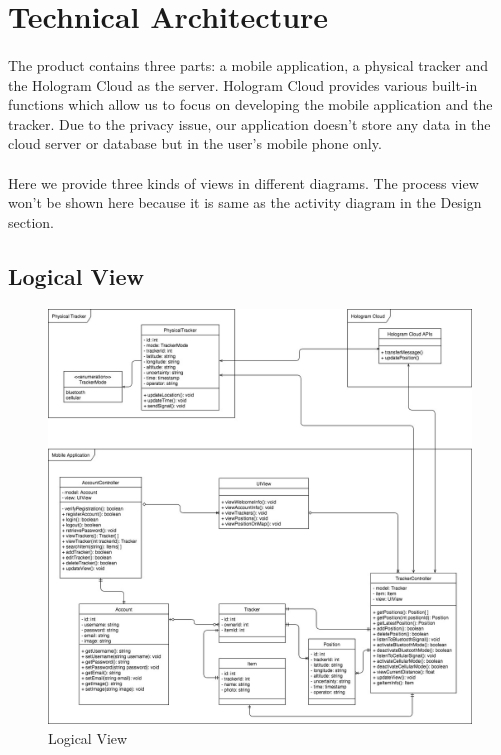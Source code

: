 \documentclass[12pt,a4paper]{article}
\begin{document}
    \section{Technical Architecture}          
      \paragraph{}
        The product contains three parts: a mobile application, a physical tracker and the Hologram Cloud as the server. Hologram Cloud provides various built-in functions which allow us to focus on developing the mobile application and the tracker. Due to the privacy issue, our application doesn't store any data in the cloud server or database but in the user's mobile phone only.
      \paragraph{}
        Here we provide three kinds of views in different diagrams. The process view won't be shown here because it is same as the activity diagram in the Design section.

      \subsection{Logical View}
        \begin{figure}[H]
          \centering
          \includegraphics[width=1\textwidth]{../assets/7-technical-architecture-logical.jpg}
          \caption{Logical View}
          \label{fig:Logical View}
        \end{figure}
\end{document}
